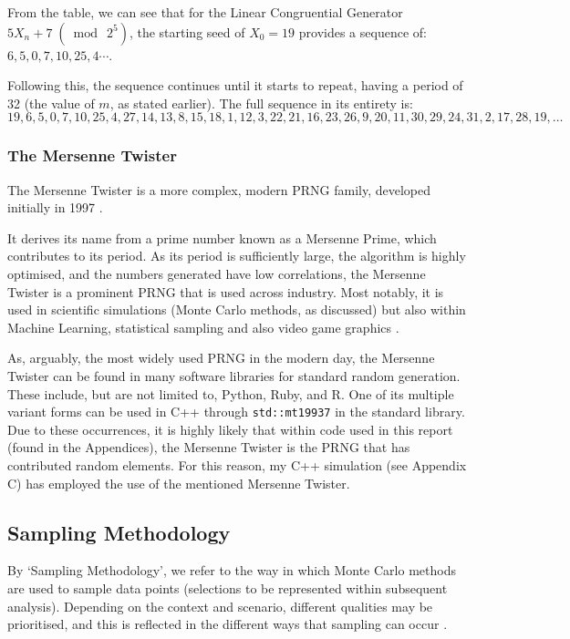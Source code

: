 \documentclass[11pt,a4paper]{article}
\begin{document}
                From the table, we can see that for the Linear Congruential Generator $5X_{n}+7\; (\bmod\: 2^5)$, the starting seed of $X_{0} = 19$ provides a sequence of: $6, 5, 0, 7, 10, 25, 4\cdots$.
                
                Following this, the sequence continues until it starts to repeat, having a period of 32 (the value of $m$, as stated earlier).
                The full sequence in its entirety is:
                \small\[
                19,6,5,0,7,10,25,4,27,14,13,8,15,18,1,12,3,22,21,16,23,26,9,20,11,30,29,24,31,2,17,28,19,\ldots
                \]

        \subsubsection{The Mersenne Twister}
            The Mersenne Twister is a more complex, modern PRNG family, developed initially in 1997 \citep{Matsumoto98}.
            
            It derives its name from a prime number known as a Mersenne Prime, which contributes to its period. As its period is sufficiently large, the algorithm is highly optimised,
            and the numbers generated have low correlations, the Mersenne Twister is a prominent PRNG that is used across industry.
            Most notably, it is used in scientific simulations (Monte Carlo methods, as discussed) but also within Machine Learning, statistical sampling and also video game graphics \citep{Samadov24}.

            As, arguably, the most widely used PRNG in the modern day, the Mersenne Twister can be found in many software libraries for standard random generation. These include, but are not limited to, Python, Ruby, and R.
            One of its multiple variant forms can be used in C++ through \verb|std::mt19937| in the standard library. Due to these occurrences, it is highly likely that within code used in this report (found in the Appendices), the Mersenne Twister is the PRNG that has contributed random elements.
            For this reason, my C++ simulation (see Appendix C) has employed the use of the mentioned Mersenne Twister.
    
    \newpage
    \subsection{Sampling Methodology}
        By `Sampling Methodology', we refer to the way in which Monte Carlo methods are used to sample data points (selections to be represented within subsequent analysis). 
        Depending on the context and scenario, different qualities may be prioritised, and this is reflected in the different ways that sampling can occur \citep{Brownlee19}.
        
\end{document}
